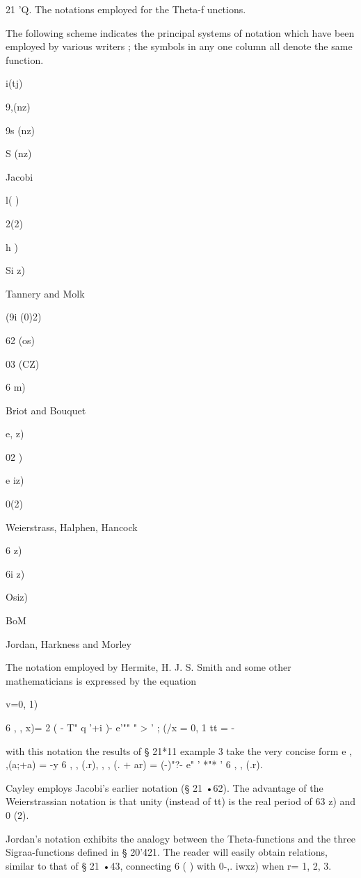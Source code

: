 21 'Q. The notations employed for the Theta-f unctions.

The following scheme indicates the principal systems of notation which
have been employed by various writers ; the symbols in any one column
all denote the same function.



 i(tj)


9,(nz)


9s (nz)


S (nz)


Jacobi


 l( )


 2(2)


h )


Si z)


Tannery and Molk


(9i (0)2)


62 (os)


03 (CZ)


6 m)


Briot and Bouquet


e, z)


02 )


e iz)


 0(2)


Weierstrass, Halphen, Hancock


6 z)


6i z)


Osiz)


BoM


Jordan, Harkness and Morley



The notation employed by Hermite, H. J. S. Smith and some other
mathematicians is expressed by the equation



v=0, 1)



6 , , x)= 2 ( - T" q '+i )- e'"" " > ' ; (/x = 0, 1 tt = -

with this notation the results of § 21*11 example 3 take the very
concise form e , ,(a;+a) = -y 6 , , (.r), , , (. + ar) = (-)"?- e" '
*"* ' 6 , , (.r).

Cayley employs Jacobi's earlier notation (§ 21 •62). The advantage of
the Weierstrassian notation is that unity (instead of tt) is the real
period of 63 z) and 0 (2).

Jordan's notation exhibits the analogy between the Theta-functions and
the three Sigraa-functions defined in § 20'421. The reader will easily
obtain relations, similar to that of § 21 •43, connecting 6 ( ) with
0-,. iwxz) when r= 1, 2, 3.

